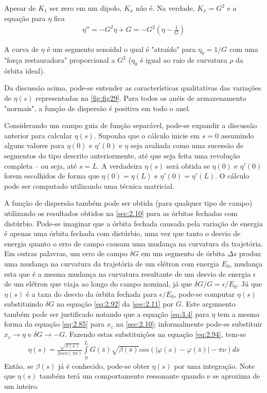 Apesar de $K_1$ ser zero em um dipolo, $K_x$ não é. Na verdade, $K_x=G^2$ e a equação para $\eta$ fica
\begin{align}
	\eta'' = -G^2\eta + G = -G^2\left(\eta - \frac{1}{G}\right)
\end{align}

A curva de $\eta$ é um segmento senoidal o qual é "atraído" para $\eta_0 = 1/G$ com uma "força restauradora" proporcional a $G^2$ ($\eta_0$ é igual ao raio de curvatura $\rho$ da órbita ideal).

Da discussão acima, pode-se entender as características qualitativas das variações de $\eta(s)$ representadas na \autoref{fig:fig29}. Para todos os anéis de armazenamento "normais", a função de dispersão é positiva em todo o anel.

Considerando um campo guia de função separável, pode-se expandir a discussão anterior para calcular $\eta(s)$. Suponha que o cálculo inicie em $s=0$ assumindo alguns valores para $\eta(0)$ e $\eta'(0)$ e $\eta$ seja avaliada como uma sucessão de segmentos do tipo descrito anteriormente, até que seja feita uma revolução completa --  ou seja, até $s=L$. A verdadeira $\eta(s)$ será obtida se $\eta(0)$ e $\eta'(0)$ forem escolhidos de forma que $\eta(0) = \eta(L)$ e $\eta'(0) = \eta'(L)$. O cálculo pode ser computado utilizando uma técnica matricial.

A função de dispersão também pode ser obtida (para qualquer tipo de campo) utilizando os resultados obtidos na \autoref{sec:2.10} para as órbitas fechadas com distúrbio. Pode-se imaginar que a órbita fechada causada pela variação de energia é apenas uma órbita fechada com distúrbio, uma vez que tanto o desvio de energia quanto o erro de campo causam uma mudança na curvatura da trajetória. Em outras palavras, um erro de campo $\delta G$ em um segmento de órbita $\Delta s$ produz uma mudança na curvatura da trajetória de um elétron com energia $E_0$, mudança esta que é a mesma mudança na curvatura resultante de um desvio de energia $\epsilon$ de um elétron que viaja ao longo do campo nominal, já que $\delta G/G = \epsilon/E_0$. Já que $\eta(s)$ é a taxa do desvio da órbita fechada para $\epsilon/E_0$, pode-se computar $\eta(s)$ substituindo $\delta G$ na equação \eqref{eq:2.92} da \autoref{sec:2.11} por $G$. Este argumento também pode ser justificado notando que a equação \eqref{eq:3.4} para $\eta$ tem a mesma forma da equação \eqref{eq:2.85} para $x_c$ na \autoref{sec:2.10}; informalmente pode-se substituir $x_c \rightarrow \eta$ e $\delta G \rightarrow -G$. Fazendo estas substituições na equação \eqref{eq:2.94}, tem-se
\begin{align}
	\eta(s) = \frac{\sqrt{\beta(s)}}{2sen(\pi\nu)}\int\limits_{0}^{L}G(\bar{s})\sqrt{\beta(\bar{s})}cos(|\varphi(s)-\varphi(\bar{s})|-\pi\nu)d\bar{s}
\end{align}
Então, se $\beta(s)$ já é conhecido, pode-se obter $\eta(s)$ por uma integração. Note que $\eta(s)$ também terá um comportamento ressonante quando $\nu$ se aproxima de um inteiro.

